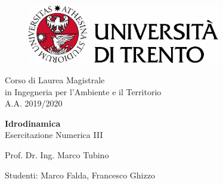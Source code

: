 \documentclass[12pt]{article} %
\begin{document}
	

\thispagestyle{empty} %
{\linespread{2.3}\selectfont
{\sffamily
	\begin{figure}
		\centering
		\includegraphics[width=0.75\textwidth]{logounitrento2019.jpg}
	\end{figure}
		
	\vspace*{-1.5em}
		
	\begin{center}
		{\Large Corso di Laurea Magistrale}\\
		\vspace*{-0.8em}
		{\Large in Ingegneria per l'Ambiente e il Territorio}\\
		\vspace*{0.5em}
		{\Large A.A. 2019/2020}
				
		\vspace*{4em}
		
		{\Huge \textbf{Idrodinamica}}\\{\Large Esercitazione Numerica III}
		
		\vspace*{4em}
		
		{\Large Prof. Dr. Ing. Marco Tubino}
	\end{center}
	
	\vspace*{3.2em}
	
    \begin{center}
	{\large
		Studenti:
	}
	{\large
		Marco Falda, Francesco Ghizzo
	}
	\end{center}

}
}
\restoregeometry
\end{document}
